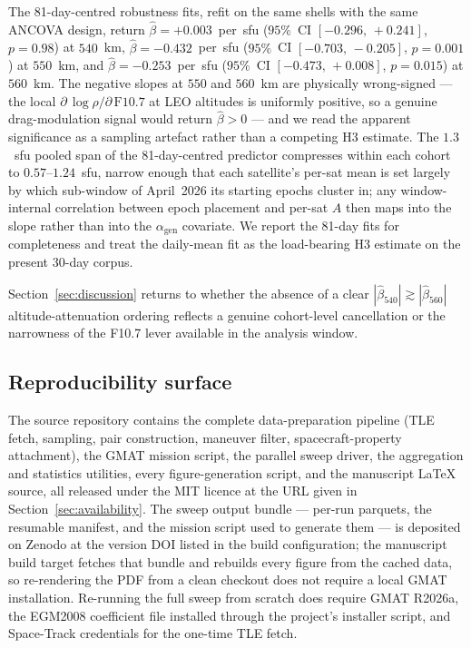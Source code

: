 \documentclass[10pt, letterpaper]{article}
\begin{document}
The 81-day-centred robustness fits, refit on the same shells
with the same ANCOVA design, return
$\hat\beta = +0.003$~per~sfu ($95\%$~CI $[-0.296,\,+0.241]$,
$p = 0.98$) at $540$~km,
$\hat\beta = -0.432$~per~sfu ($95\%$~CI $[-0.703,\,-0.205]$,
$p = 0.001$) at $550$~km, and
$\hat\beta = -0.253$~per~sfu ($95\%$~CI $[-0.473,\,+0.008]$,
$p = 0.015$) at $560$~km. The negative slopes at $550$ and
$560$~km are physically wrong-signed --- the local
$\partial\,\log\rho / \partial\,\mathrm{F}10.7$ at LEO altitudes
is uniformly positive, so a genuine drag-modulation signal would
return $\hat\beta > 0$ --- and we read the apparent significance
as a sampling artefact rather than a competing H3 estimate. The
$1.3$~sfu pooled span of the 81-day-centred predictor compresses
within each cohort to $0.57$--$1.24$~sfu, narrow enough that each
satellite's per-sat mean is set largely by which sub-window of
April~2026 its starting epochs cluster in; any window-internal
correlation between epoch placement and per-sat $A$ then maps
into the slope rather than into the $\alpha_{\mathrm{gen}}$
covariate. We report the 81-day fits for completeness and
treat the daily-mean fit as the load-bearing H3 estimate on the
present 30-day corpus.

Section~\ref{sec:discussion}
returns to whether the absence of a clear $|\hat\beta_{540}|
\gtrsim |\hat\beta_{560}|$ altitude-attenuation ordering reflects
a genuine cohort-level cancellation or the narrowness of the
F10.7 lever available in the analysis window.

\subsection{Reproducibility surface}
\label{sec:methods-reproducibility}

The source repository contains the complete data-preparation
pipeline (TLE fetch, sampling, pair construction, maneuver filter,
spacecraft-property attachment), the GMAT mission script, the
parallel sweep driver, the aggregation and statistics utilities,
every figure-generation script, and the manuscript \LaTeX{} source,
all released under the MIT licence at the URL given in
Section~\ref{sec:availability}. The sweep output bundle --- per-run
parquets, the resumable manifest, and the mission script used to
generate them --- is deposited on Zenodo at the version DOI listed
in the build configuration; the manuscript build target fetches that
bundle and rebuilds every figure from the cached data, so
re-rendering the PDF from a clean checkout does not require a local
GMAT installation. Re-running the full sweep from scratch does
require GMAT R2026a, the EGM2008 coefficient file installed through
the project's installer script, and Space-Track credentials for the
one-time TLE fetch.
\end{document}
